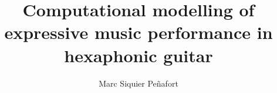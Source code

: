 




\title{Computational modelling of expressive music performance in hexaphonic guitar}
\author{Marc Siquier Peñafort}

\maketitle

\maketitle
\cleardoublepage
\restoregeometry
\sloppy





\preface
\body











\cleardoublepage



